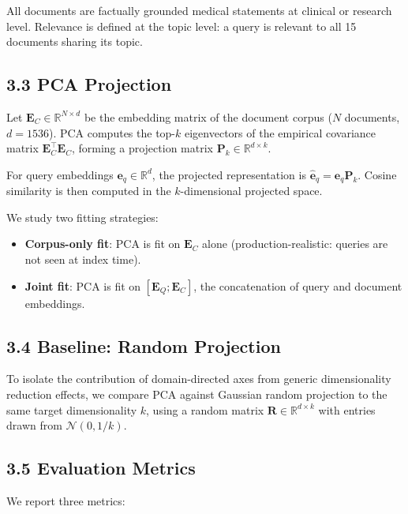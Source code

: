 \documentclass[
  11pt,
  letterpaper,
]{article}
\providecommand{\tightlist}{%
  \setlength{\itemsep}{0pt}\setlength{\parskip}{0pt}}
\begin{document}
All documents are factually grounded medical statements at clinical or
research level. Relevance is defined at the topic level: a query is
relevant to all 15 documents sharing its topic.

\subsection{3.3 PCA Projection}\label{pca-projection}

Let \(\mathbf{E}_C \in \mathbb{R}^{N \times d}\) be the embedding matrix
of the document corpus (\(N\) documents, \(d = 1536\)). PCA computes the
top-\(k\) eigenvectors of the empirical covariance matrix
\(\mathbf{E}_C^\top \mathbf{E}_C\), forming a projection matrix
\(\mathbf{P}_k \in \mathbb{R}^{d \times k}\).

For query embeddings \(\mathbf{e}_q \in \mathbb{R}^d\), the projected
representation is \(\hat{\mathbf{e}}_q = \mathbf{e}_q \mathbf{P}_k\).
Cosine similarity is then computed in the \(k\)-dimensional projected
space.

We study two fitting strategies:

\begin{itemize}
\tightlist
\item
  \textbf{Corpus-only fit}: PCA is fit on \(\mathbf{E}_C\) alone
  (production-realistic: queries are not seen at index time).
\item
  \textbf{Joint fit}: PCA is fit on \([\mathbf{E}_Q; \mathbf{E}_C]\),
  the concatenation of query and document embeddings.
\end{itemize}

\subsection{3.4 Baseline: Random
Projection}\label{baseline-random-projection}

To isolate the contribution of domain-directed axes from generic
dimensionality reduction effects, we compare PCA against Gaussian random
projection to the same target dimensionality \(k\), using a random
matrix \(\mathbf{R} \in \mathbb{R}^{d \times k}\) with entries drawn
from \(\mathcal{N}(0, 1/k)\).

\subsection{3.5 Evaluation Metrics}\label{evaluation-metrics}

We report three metrics:
\end{document}
